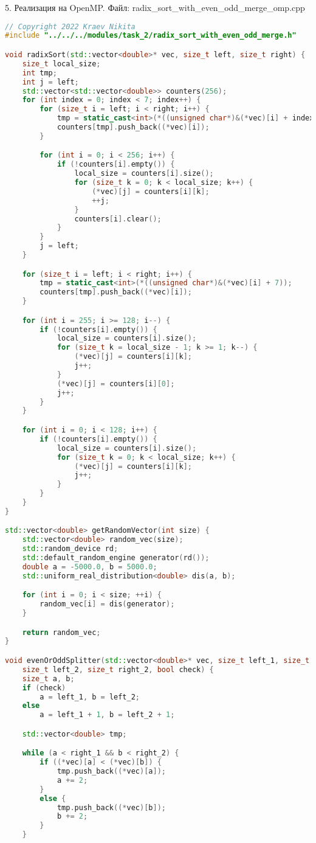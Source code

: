 \documentclass{report}
\begin{document}
\par 5. Реализация на OpenMP. Файл: radix\_sort\_with\_even\_odd\_merge\_omp.cpp

\begin{lstlisting}[language=C++]
// Copyright 2022 Kraev Nikita
#include "../../../modules/task_2/radix_sort_with_even_odd_merge.h"

void radixSort(std::vector<double>* vec, size_t left, size_t right) {
	size_t local_size;
	int tmp;
	int j = left;
	std::vector<std::vector<double>> counters(256);
	for (int index = 0; index < 7; index++) {
		for (size_t i = left; i < right; i++) {
			tmp = static_cast<int>(*((unsigned char*)&(*vec)[i] + index));
			counters[tmp].push_back((*vec)[i]);
		}

		for (int i = 0; i < 256; i++) {
			if (!counters[i].empty()) {
				local_size = counters[i].size();
				for (size_t k = 0; k < local_size; k++) {
					(*vec)[j] = counters[i][k];
					++j;
				}
				counters[i].clear();
			}
		}
		j = left;
	}

	for (size_t i = left; i < right; i++) {
		tmp = static_cast<int>(*((unsigned char*)&(*vec)[i] + 7));
		counters[tmp].push_back((*vec)[i]);
	}

	for (int i = 255; i >= 128; i--) {
		if (!counters[i].empty()) {
			local_size = counters[i].size();
			for (size_t k = local_size - 1; k >= 1; k--) {
				(*vec)[j] = counters[i][k];
				j++;
			}
			(*vec)[j] = counters[i][0];
			j++;
		}
	}

	for (int i = 0; i < 128; i++) {
		if (!counters[i].empty()) {
			local_size = counters[i].size();
			for (size_t k = 0; k < local_size; k++) {
				(*vec)[j] = counters[i][k];
				j++;
			}
		}
	}
}

std::vector<double> getRandomVector(int size) {
	std::vector<double> random_vec(size);
	std::random_device rd;
	std::default_random_engine generator(rd());
	double a = -5000.0, b = 5000.0;
	std::uniform_real_distribution<double> dis(a, b);

	for (int i = 0; i < size; ++i) {
		random_vec[i] = dis(generator);
	}

	return random_vec;
}

void evenOrOddSplitter(std::vector<double>* vec, size_t left_1, size_t right_1,
	size_t left_2, size_t right_2, bool check) {
	size_t a, b;
	if (check)
		a = left_1, b = left_2;
	else
		a = left_1 + 1, b = left_2 + 1;

	std::vector<double> tmp;

	while (a < right_1 && b < right_2) {
		if ((*vec)[a] < (*vec)[b]) {
			tmp.push_back((*vec)[a]);
			a += 2;
		}
		else {
			tmp.push_back((*vec)[b]);
			b += 2;
		}
	}


\end{lstlisting}
\end{document}
